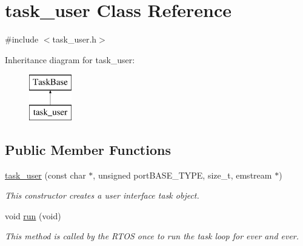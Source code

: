 \hypertarget{classtask__user}{\section{task\-\_\-user Class Reference}
\label{classtask__user}
}


{\ttfamily \#include $<$task\-\_\-user.\-h$>$}

Inheritance diagram for task\-\_\-user\-:\begin{figure}[H]
\begin{center}
\leavevmode
\includegraphics[height=2.000000cm]{classtask__user}
\end{center}
\end{figure}
\subsection*{Public Member Functions}
\begin{DoxyCompactItemize}
\item 
\hyperlink{classtask__user_a3aba77563b375bb14838800608da48bc}{task\-\_\-user} (const char $\ast$, unsigned port\-B\-A\-S\-E\-\_\-\-T\-Y\-P\-E, size\-\_\-t, emstream $\ast$)
\begin{DoxyCompactList}\small\item\em This constructor creates a user interface task object. \end{DoxyCompactList}\item 
void \hyperlink{classtask__user_adca6429d57be25e8d411414fc8ad75af}{run} (void)
\begin{DoxyCompactList}\small\item\em This method is called by the R\-T\-O\-S once to run the task loop for ever and ever. \end{DoxyCompactList}\end{DoxyCompactItemize}
